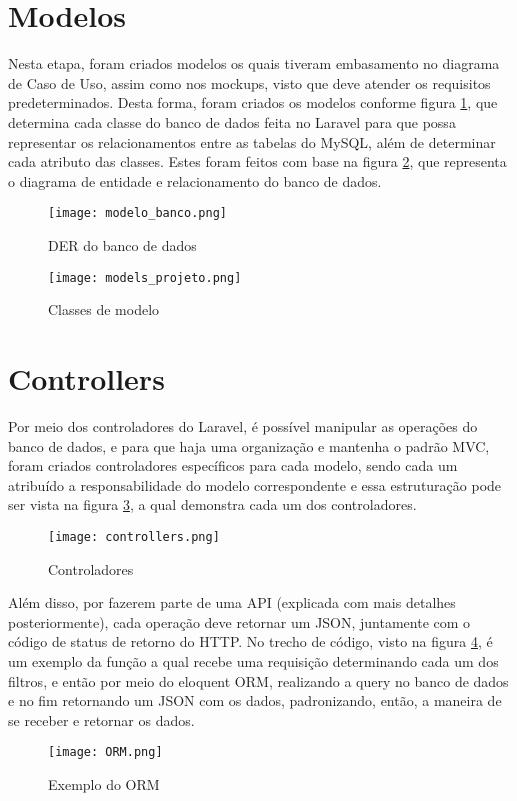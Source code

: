 \section{Modelos}
Nesta etapa, foram criados modelos os quais tiveram embasamento no diagrama de Caso de Uso, assim como nos mockups, visto que deve atender os requisitos predeterminados. Desta forma, foram criados os modelos conforme figura \ref{modelo_banco}, que determina cada classe do banco de dados feita no Laravel para que possa representar os relacionamentos entre as tabelas do MySQL, além de determinar cada atributo das classes. Estes foram feitos com base na figura \ref{models_projeto}, que representa o diagrama de entidade e relacionamento do banco de dados.
\begin{figure}[h]
    \caption{\label{modelo_banco}DER do banco de dados}
    \vspace{5pt}
    \centering
    \texttt{[image: modelo\_banco.png]}
    \vspace{5pt}
\end{figure}
\begin{figure}[h]
    \caption{\label{models_projeto}Classes de modelo}
    \vspace{5pt}
    \centering
    \texttt{[image: models\_projeto.png]}
    \vspace{5pt}
\end{figure}

\section{Controllers}
Por meio dos controladores do Laravel, é possível manipular as operações do banco de dados, e para que haja uma organização e mantenha o padrão MVC, foram criados controladores específicos para cada modelo, sendo cada um atribuído a responsabilidade do modelo correspondente e essa estruturação pode ser vista na figura \ref{controllers}, a qual demonstra cada um dos controladores.
\begin{figure}[h]
    \caption{\label{controllers}Controladores}
    \vspace{5pt}
    \centering
    \texttt{[image: controllers.png]}
    \vspace{5pt}
\end{figure}

Além disso, por fazerem parte de uma API (explicada com mais detalhes posteriormente), cada operação deve retornar um JSON, juntamente com o código de status de retorno do HTTP. No trecho de código, visto na figura \ref{orm}, é um exemplo da função a qual recebe uma requisição determinando cada um dos filtros, e então por meio do eloquent ORM, realizando a query no banco de dados e no fim retornando um JSON com os dados, padronizando, então, a maneira de se receber e retornar os dados.
\begin{figure}[h]
    \caption{\label{orm}Exemplo do ORM}
    \vspace{5pt}
    \centering
    \texttt{[image: ORM.png]}
    \vspace{5pt}
\end{figure}

